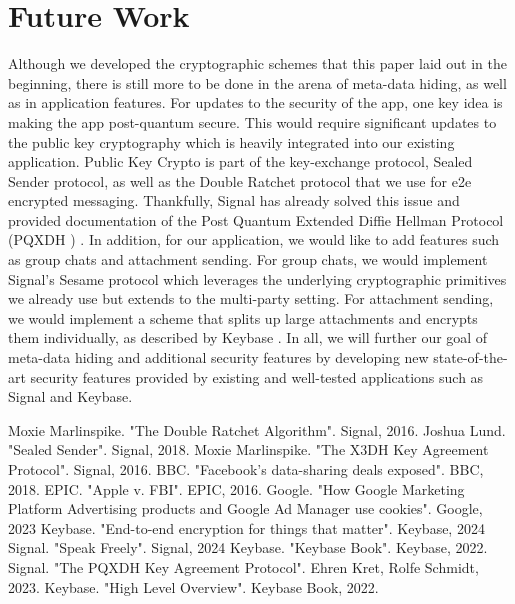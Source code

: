 \documentclass[conference]{IEEEtran}
\begin{document}
\section{Future Work}
Although we developed the cryptographic schemes that this paper laid out in the beginning, there is still more to be done in the arena of meta-data hiding, as well as in application features. For updates to the security of the app, one key idea is making the app post-quantum secure. This would require significant updates to the public key cryptography which is heavily integrated into our existing application. Public Key Crypto is part of the key-exchange protocol, Sealed Sender protocol, as well as the Double Ratchet protocol that we use for e2e encrypted messaging. Thankfully, Signal has already solved this issue and provided documentation of the Post Quantum Extended Diffie Hellman Protocol (PQXDH ) \cite{https://signal.org/docs/specifications/pqxdh/}. In addition, for our application, we would like to add features such as group chats and attachment sending. For group chats, we would implement Signal's Sesame protocol which leverages the underlying cryptographic primitives we already use but extends to the multi-party setting. For attachment sending, we would implement a scheme that splits up large attachments and encrypts them individually, as described by Keybase \cite{https://book.keybase.io/docs/chat/crypto}. In all, we will further our goal of meta-data hiding and additional security features by developing new state-of-the-art security features provided by existing and well-tested applications such as Signal and Keybase.


\begin{thebibliography}{9}

Moxie Marlinspike. "The Double Ratchet Algorithm". Signal, 2016.
Joshua Lund. "Sealed Sender". Signal, 2018.
Moxie Marlinspike. "The X3DH Key Agreement Protocol". Signal, 2016.
BBC. "Facebook's data-sharing deals exposed". BBC, 2018.
EPIC. "Apple v. FBI". EPIC, 2016.
Google. "How Google Marketing Platform Advertising products and Google Ad Manager use cookies". Google, 2023
Keybase. "End-to-end encryption for things that matter". Keybase, 2024
Signal. "Speak Freely". Signal, 2024
Keybase. "Keybase Book". Keybase, 2022.
Signal. "The PQXDH Key Agreement Protocol". Ehren Kret, Rolfe Schmidt, 2023.
Keybase. "High Level Overview". Keybase Book, 2022.

\end{thebibliography}
\end{document}
